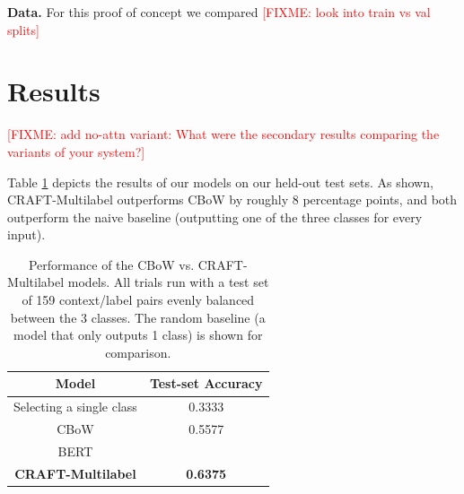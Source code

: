 \documentclass{article}
\newcommand{\fixme}[1]{\textcolor{red}{[FIXME: #1]}}
\begin{document}
\textbf{Data.} For this proof of concept we compared \fixme{look into train vs val splits}


\section{Results}
\label{sec:results}

\fixme{add no-attn variant: What were the secondary results comparing the variants of your system?}

Table \ref{tab:results} depicts the results of our models on our held-out test sets. As shown, CRAFT-Multilabel outperforms CBoW by roughly 8 percentage points, and both outperform the naive baseline (outputting one of the three classes for every input). 

\begin{table}[t]
  \centering
  \begin{tabular}{@{}cc@{}}
  \toprule
  \textbf{Model}            & \textbf{Test-set Accuracy} \\ \midrule
  Selecting a single class           & 0.3333                           \\
  CBoW                       & 0.5577                           \\
  BERT & \\
  \textbf{CRAFT-Multilabel} & \textbf{0.6375}                  \\ \bottomrule
  \end{tabular}
  \caption{Performance of the CBoW vs. CRAFT-Multilabel models. All trials run with a test set of 159 context/label pairs evenly balanced between the 3 classes. The random baseline (a model that only outputs 1 class) is shown for comparison.}
  \label{tab:results}
\end{table}


\end{document}
